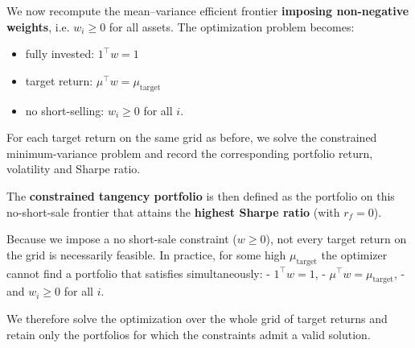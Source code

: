 \documentclass[11pt]{article}
\providecommand{\tightlist}{%
      \setlength{\itemsep}{0pt}\setlength{\parskip}{0pt}}
\begin{document}
We now recompute the mean--variance efficient frontier \textbf{imposing
non-negative weights}, i.e. \(w_i \ge 0\) for all assets. The
optimization problem becomes:

\begin{itemize}
\tightlist
\item
  fully invested: \(1^\top w = 1\)\\
\item
  target return: \(\mu^\top w = \mu_{\text{target}}\)\\
\item
  no short-selling: \(w_i \ge 0\) for all \(i\).
\end{itemize}

For each target return on the same grid as before, we solve the
constrained minimum-variance problem and record the corresponding
portfolio return, volatility and Sharpe ratio.

The \textbf{constrained tangency portfolio} is then defined as the
portfolio on this no-short-sale frontier that attains the
\textbf{highest Sharpe ratio} (with \(r_f = 0\)).

    Because we impose a no short-sale constraint (\(w \ge 0\)), not every
target return on the grid is necessarily feasible. In practice, for some
high \(\mu_{\text{target}}\) the optimizer cannot find a portfolio that
satisfies simultaneously: - \(1^\top w = 1\), -
\(\mu^\top w = \mu_{\text{target}}\), - and \(w_i \ge 0\) for all \(i\).

We therefore solve the optimization over the whole grid of target
returns and retain only the portfolios for which the constraints admit a
valid solution.
\end{document}
